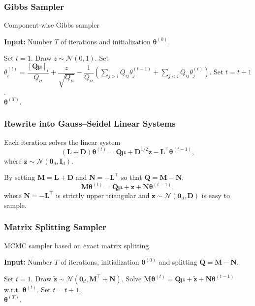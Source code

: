 \documentclass[aspectratio=169]{beamer}
\newcommand{\B}[1]{\mathbf{#1}} %
\newcommand{\Bs}[1]{\boldsymbol{#1}} %
\newcommand{\pr}[1]{\left(#1\right)} %
\begin{document}
\begin{frame}
\frametitle{Gibbs Sampler}
\begin{algorithm}[H]
\caption{Component-wise Gibbs sampler}
\hspace*{\algorithmicindent} \textbf{Input:} Number $T$ of iterations and initialization $\Bs{\theta}^{(0)}$.
\begin{algorithmic}[1]
\State Set $t = 1$.
    \State Draw $z \sim \mathcal{N}(0,1)$.
    \State Set $\theta^{(t)}_i = \dfrac{[\B{Q}\Bs{\mu}]_i}{Q_{ii}} + \dfrac{z}{\sqrt{Q_{ii}}} - \dfrac{1}{Q_{ii}}\pr{\displaystyle\sum_{j > i}Q_{ij}\theta_j^{(t-1)} + \displaystyle\sum_{j < i}Q_{ij}\theta_j^{(t)}}$.
    \EndFor
    \State Set $t = t + 1$.
\EndWhile\\
\Return $\Bs{\theta}^{(T)}$.
\end{algorithmic}
\end{algorithm}
\end{frame}

\begin{frame}
\frametitle{Rewrite into Gauss--Seidel Linear Systems}
Each iteration solves the linear system
\[(\B{L} + \B{D})\Bs{\theta}^{(t)} = \B{Q}\Bs{\mu} + \B{D}^{1/2}\B{z} - \B{L}^{\top}\Bs{\theta}^{(t-1)},\]
where $\B{z} \sim \mathcal{N}(\B{0}_d,\B{I}_d)$.

By setting $\B{M} = \B{L}+\B{D}$ and $\B{N} = -\B{L}^{\top}$ so that $\B{Q} = \B{M} - \B{N}$,
\[
  \B{M}\Bs{\theta}^{(t)} = \B{Q}\Bs{\mu} +  \tilde{\B{z}}+\B{N}\Bs{\theta}^{(t-1)},
\]
where $\B{N} = -\B{L}^{\top}$ is strictly upper triangular and $\tilde{\B{z}} \sim \mathcal{N}(\B{0}_d,\B{D})$ is easy to sample.
\end{frame}

\begin{frame}
\frametitle{Matrix Splitting Sampler}
\begin{algorithm}[H]
\caption{MCMC sampler based on exact matrix splitting}
\hspace*{\algorithmicindent} \textbf{Input:} Number $T$ of iterations, initialization $\Bs{\theta}^{(0)}$ and splitting $\B{Q} = \B{M} - \B{N}$.
\begin{algorithmic}[1]
\State Set $t=1$.
    \State Draw $\tilde{\B{z}} \sim \mathcal{N}(\B{0}_d,\B{M}^{\top} + \B{N})$.
    \State Solve $\B{M}\Bs{\theta}^{(t)} = \B{Q}\Bs{\mu} + \tilde{\B{z}} + \B{N}\Bs{\theta}^{(t-1)} $ w.r.t. $\Bs{\theta}^{(t)}$.
    \State Set $t = t + 1$.
\EndWhile\\
\Return $\Bs{\theta}^{(T)}$.
\end{algorithmic}
\end{algorithm}
\end{frame}
\end{document}
